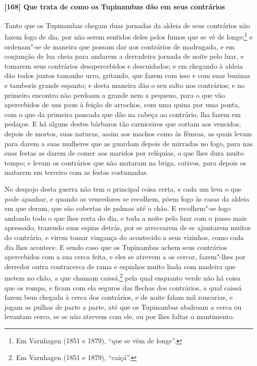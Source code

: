 \begin{linenumbers}
\paragraph{[168] Que trata de como os Tupinambas dão em seus contrários}\quad
Tanto que os Tupinambas chegam duas jornadas da aldeia de seus contrários não fazem fogo
de dia, por não serem sentidos deles pelos fumos que se vê de longe;\footnote{ Em
Varnhagen (1851 e 1879), ``que se vêm de longe''.} e ordenam"-se de maneira que possam dar
nos contrários de madrugada, e em conjunção de lua cheia para andarem a derradeira jornada
de noite pelo luar, e tomarem seus contrários desapercebidos e descuidados; e em chegando
à aldeia dão todos juntos tamanho urro, gritando, que fazem com isso e com suas buzinas e
tamboris grande espanto; e desta maneira dão o seu salto nos contrários; e no primeiro
encontro não perdoam a grande nem a pequeno, para o que vão apercebidos de uns paus à
feição de arrochos, com uma quina por uma ponta, com o que da primeira pancada que dão na
cabeça ao contrário, lha fazem em pedaços. E há alguns destes bárbaros tão carniceiros que
cortam aos vencidos, depois de mortos, suas naturas, assim aos machos como às fêmeas, as
quais levam para darem a suas mulheres que as guardam depois de mirradas no fogo, para nas
suas festas as darem de comer aos maridos por relíquias, o que lhes dura muito tempo; e
levam os contrários que não mataram na briga, cativos, para depois os matarem em terreiro
com as festas costumadas.

No despojo desta guerra não tem o principal coisa certa, e cada um leva o que pode
apanhar, e quando os vencedores se recolhem, põem fogo às casas da aldeia em que deram,
que são cobertas de palmas até o chão. E recolhem"-se logo andando todo o que lhes resta do
dia, e toda a noite pelo luar com o passo mais apressado, trazendo suas espias detrás, por
se arrecearem de se ajuntarem muitos do contrário, e virem tomar vingança do acontecido a
seus vizinhos, como cada dia lhes acontece. E sendo caso que os Tupinambas achem seus
contrários apercebidos com a sua cerca feita, e eles se atrevem a os cercar, fazem"-lhes
por derredor outra contracerca de rama e espinhos muito liada com madeira que metem no
chão, a que chamam caissá,\footnote{ Em Varnhagen (1851 e 1879), ``caiçá''.} pela qual
enquanto verde não há coisa que os rompa, e ficam com ela seguros das flechas dos
contrários, a qual caissá fazem bem chegada à cerca dos contrários, e de noite falam mil
roncarias, e jogam as pulhas de parte a parte, até que os Tupinambas abalroam a cerca ou
levantam cerco, se se não atrevem com ele, ou por lhes faltar o mantimento.


\end{linenumbers}
